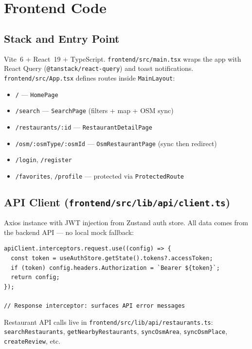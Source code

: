 \documentclass[11pt,a4paper]{article}
\begin{document}
\section{Frontend Code}

\subsection{Stack and Entry Point}

Vite~6 + React~19 + TypeScript. \texttt{frontend/src/main.tsx} wraps the app with
React Query (\texttt{@tanstack/react-query}) and toast notifications.
\texttt{frontend/src/App.tsx} defines routes inside \texttt{MainLayout}:

\begin{itemize}
  \item \texttt{/} --- \texttt{HomePage}
  \item \texttt{/search} --- \texttt{SearchPage} (filters + map + OSM sync)
  \item \texttt{/restaurants/:id} --- \texttt{RestaurantDetailPage}
  \item \texttt{/osm/:osmType/:osmId} --- \texttt{OsmRestaurantPage} (sync then redirect)
  \item \texttt{/login}, \texttt{/register}
  \item \texttt{/favorites}, \texttt{/profile} --- protected via \texttt{ProtectedRoute}
\end{itemize}

\subsection{API Client (\texttt{frontend/src/lib/api/client.ts})}

Axios instance with JWT injection from Zustand auth store.
All data comes from the backend API --- no local mock fallback:

\begin{lstlisting}
apiClient.interceptors.request.use((config) => {
  const token = useAuthStore.getState().tokens?.accessToken;
  if (token) config.headers.Authorization = `Bearer ${token}`;
  return config;
});

// Response interceptor: surfaces API error messages
\end{lstlisting}

Restaurant API calls live in \texttt{frontend/src/lib/api/restaurants.ts}:
\texttt{searchRestaurants}, \texttt{getNearbyRestaurants}, \texttt{syncOsmArea},
\texttt{syncOsmPlace}, \texttt{createReview}, etc.
\end{document}

